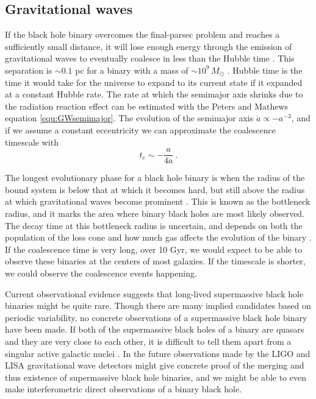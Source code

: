 \documentclass[english, oneside]{HYgradu}
\begin{document}
\subsection{Gravitational waves}

If the black hole binary overcomes the final-parsec problem and reaches a sufficiently small distance, it will lose enough energy through the emission of gravitational waves to eventually coalesce in less than the Hubble time \citep{milosavljevic:2003}. This separation is $\sim 0.1$ pc for a binary with a mass of $\sim 10^9 \, M_\odot$ \citep{rantala:2018}. Hubble time is the time it would take for the universe to expand to its current state if it expanded at a constant Hubble rate. The rate at which the semimajor axis shrinks due to the radiation reaction effect can be estimated with the Peters and Mathews equation \ref{equ:GWsemimajor}. The evolution of the semimajor axis $\dot{a} \propto -a^{-3}$, and if we assume a constant eccentricity we can approximate the coalescence timescale with \citep{bt-galdyn}
\begin{equation}
t_c \sim -\frac{a}{4\dot{a}} \ .
\end{equation}

The longest evolutionary phase for a black hole binary is when the radius of the bound system is below that at which it becomes hard, but still above the radius at which gravitational waves become prominent \citep{begelman:1980}. This is known as the bottleneck radius, and it marks the area where binary black holes are most likely observed. The decay time at this bottleneck radius is uncertain, and depends on both the population of the loss cone and how much gas affects the evolution of the binary \citep{bt-galdyn}. If the coalescence time is very long, over 10 Gyr, we would expect to be able to observe these binaries at the centers of most galaxies. If the timescale is shorter, we could observe the coalescence events happening.

Current observational evidence suggests that long-lived supermassive black hole binaries might be quite rare. Though there are many implied candidates based on periodic variability, no concrete observations of a supermassive black hole binary have been made. If both of the supermassive black holes of a binary are quasars and they are very close to each other, it is difficult to tell them apart from a singular active galactic nuclei \citep{roedig:2014}. In the future observations made by the LIGO and LISA gravitational wave detectors might give concrete proof of the merging and thus existence of supermassive black hole binaries, and we might be able to even make interferometric direct observations of a binary black hole.
\end{document}
